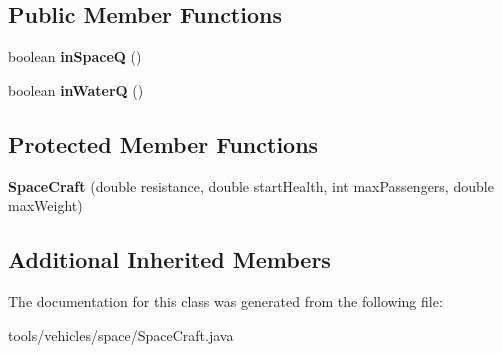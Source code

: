 \subsection*{Public Member Functions}
\begin{DoxyCompactItemize}
\item 
boolean {\bfseries in\+SpaceQ} ()\hypertarget{classtools_1_1vehicles_1_1space_1_1_space_craft_a9fb50840b623b449c08e57b75d22351f}{}\label{classtools_1_1vehicles_1_1space_1_1_space_craft_a9fb50840b623b449c08e57b75d22351f}

\item 
boolean {\bfseries in\+WaterQ} ()\hypertarget{classtools_1_1vehicles_1_1space_1_1_space_craft_a1961ff4e3e50afb7fbc8cc1d1979c04f}{}\label{classtools_1_1vehicles_1_1space_1_1_space_craft_a1961ff4e3e50afb7fbc8cc1d1979c04f}

\end{DoxyCompactItemize}
\subsection*{Protected Member Functions}
\begin{DoxyCompactItemize}
\item 
{\bfseries Space\+Craft} (double resistance, double start\+Health, int max\+Passengers, double max\+Weight)\hypertarget{classtools_1_1vehicles_1_1space_1_1_space_craft_a0fbf7a03afdd98e8fe807071b78d0549}{}\label{classtools_1_1vehicles_1_1space_1_1_space_craft_a0fbf7a03afdd98e8fe807071b78d0549}

\end{DoxyCompactItemize}
\subsection*{Additional Inherited Members}


The documentation for this class was generated from the following file\+:\begin{DoxyCompactItemize}
\item 
tools/vehicles/space/Space\+Craft.\+java\end{DoxyCompactItemize}
